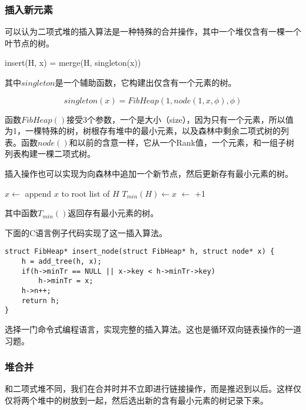 \documentclass{ctexart}
\begin{document}
\subsubsection{插入新元素}

可以认为二项式堆的插入算法是一种特殊的合并操作，其中一个堆仅含有一棵一个叶节点的树。

\be
insert(H, x) = merge(H, singleton(x))
\label{eq:fib-insert}
\ee

其中$singleton$是一个辅助函数，它构建出仅含有一个元素的树。

\[
singleton(x) = FibHeap(1, node(1, x, \phi), \phi)
\]

函数$FibHeap()$接受3个参数，一个是大小（size），因为只有一个元素，所以值为1，一棵特殊的树，树根存有堆中的最小元素，以及森林中剩余二项式树的列表。函数$node()$和以前的含意一样，它从一个Rank值，一个元素，和一组子树列表构建一棵二项式树。

插入操作也可以实现为向森林中追加一个新节点，然后更新存有最小元素的树。

\begin{algorithmic}[1]
  \State $x \gets$  
  \State append $x$ to root list of $H$
    \State $T_{min}(H) \gets x$
  \EndIf
  \State {} $\gets$ +1
\EndFunction
\end{algorithmic}

其中函数$T_{min}()$返回存有最小元素的树。

下面的C语言例子代码实现了这一插入算法。

\lstset{language=C}
\begin{lstlisting}
struct FibHeap* insert_node(struct FibHeap* h, struct node* x) {
    h = add_tree(h, x);
    if(h->minTr == NULL || x->key < h->minTr->key)
        h->minTr = x;
    h->n++;
    return h;
}
\end{lstlisting}

\begin{Exercise}
选择一门命令式编程语言，实现完整的插入算法。这也是循环双向链表操作的一道习题。
\end{Exercise}

\subsubsection{堆合并}

和二项式堆不同，我们在合并时并不立即进行链接操作，而是推迟到以后。这样仅仅将两个堆中的树放到一起，然后选出新的含有最小元素的树记录下来。
\end{document}
